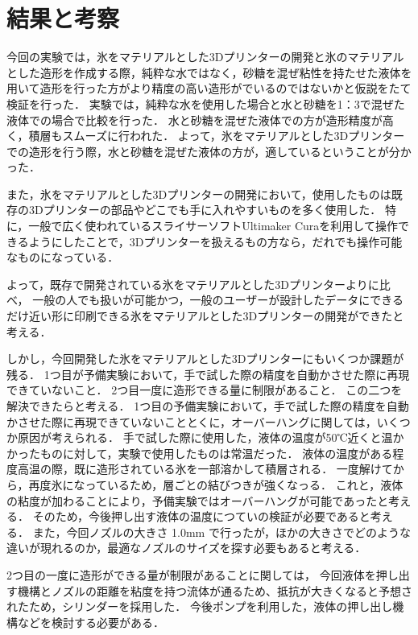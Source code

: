 \chapter{結果と考察}
\label{chp:first}

今回の実験では，氷をマテリアルとした3Dプリンターの開発と氷のマテリアルとした造形を作成する際，純粋な水ではなく，砂糖を混ぜ粘性を持たせた液体を用いて造形を行った方がより精度の高い造形がでいるのではないかと仮説をたて検証を行った．
実験では，純粋な水を使用した場合と水と砂糖を1：3で混ぜた液体での場合で比較を行った．
水と砂糖を混ぜた液体での方が造形精度が高く，積層もスムーズに行われた．
よって，氷をマテリアルとした3Dプリンターでの造形を行う際，水と砂糖を混ぜた液体の方が，適しているということが分かった．

また，氷をマテリアルとした3Dプリンターの開発において，使用したものは既存の3Dプリンターの部品やどこでも手に入れやすいものを多く使用した．
特に，一般で広く使われているスライサーソフトUltimaker Curaを利用して操作できるようにしたことで，3Dプリンターを扱えるもの方なら，だれでも操作可能なものになっている．

よって，既存で開発されている氷をマテリアルとした3Dプリンターよりに比べ，
一般の人でも扱いが可能かつ，一般のユーザーが設計したデータにできるだけ近い形に印刷できる氷をマテリアルとした3Dプリンターの開発ができたと考える．

しかし，今回開発した氷をマテリアルとした3Dプリンターにもいくつか課題が残る．
1つ目が予備実験において，手で試した際の精度を自動かさせた際に再現できていないこと．
2つ目一度に造形できる量に制限があること．
この二つを解決できたらと考える．
1つ目の予備実験において，手で試した際の精度を自動かさせた際に再現できていないこととくに，オーバーハングに関しては，いくつか原因が考えられる．
手で試した際に使用した，液体の温度が50℃近くと温かかったものに対して，実験で使用したものは常温だった．
液体の温度がある程度高温の際，既に造形されている氷を一部溶かして積層される．
一度解けてから，再度氷になっているため，層ごとの結びつきが強くなっる．
これと，液体の粘度が加わることにより，予備実験ではオーバーハングが可能であったと考える．
そのため，今後押し出す液体の温度につていの検証が必要であると考える．
また，今回ノズルの大きさ 1.0mm で行ったが，ほかの大きさでどのような違いが現れるのか，最適なノズルのサイズを探す必要もあると考える．

2つ目の一度に造形ができる量が制限があることに関しては，
今回液体を押し出す機構とノズルの距離を粘度を持つ流体が通るため、抵抗が大きくなると予想されたため，シリンダーを採用した．
今後ポンプを利用した，液体の押し出し機構などを検討する必要がある．



